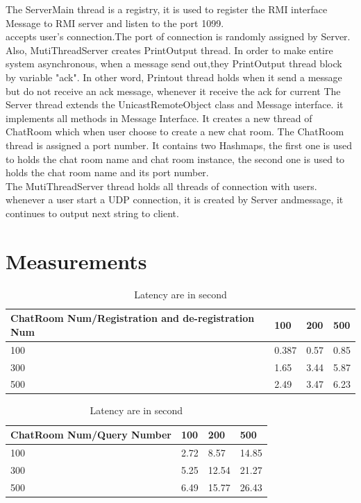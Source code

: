 \documentclass{article}
\begin{document}
The ServerMain thread is a registry, it is used to register the RMI interface Message to RMI server and listen to the port 1099.\\
 accepts user's connection.The port of connection is randomly assigned by Server. Also, MutiThreadServer creates PrintOutput thread. In order to make entire system asynchronous, when a message send out,they PrintOutput thread block by variable "ack". In other word, Printout thread holds when it send a message but do not receive an ack message, whenever it receive the ack for current 
The Server thread extends the UnicastRemoteObject class and Message interface. it implements all methods in Message Interface. It creates a new thread of ChatRoom which when user choose to create a new chat room. The ChatRoom thread is assigned a port number. It contains two Hashmaps, the first one is used to  holds the chat room name and chat room instance, the second one is used to holds the chat room name and its port number.\\

The MutiThreadServer thread holds all threads of connection with users. whenever a user start a UDP connection, it is created by Server andmessage, it continues to output next string to client.\\

\section{Measurements}


\begin{table}[h]
\begin{tabular}{|l|l|l|l|}
\hline
ChatRoom Num/Registration and de-registration Num & 100   & 200  & 500  \\ \hline
100                                               & 0.387 & 0.57 & 0.85 \\ \hline
300                                               & 1.65  & 3.44 & 5.87 \\ \hline
500                                               & 2.49  & 3.47 & 6.23 \\ \hline
\end{tabular}
\caption{Latency are in second}
\label{my-label}
\end{table}

\begin{table}[h]
\begin{tabular}{|l|l|l|l|}
\hline
ChatRoom Num/Query Number & 100   & 200  & 500  \\ \hline
100                                               & 2.72 & 8.57 & 14.85 \\ \hline
300                                               & 5.25  & 12.54 & 21.27 \\ \hline
500                                               & 6.49  & 15.77 & 26.43 \\ \hline
\end{tabular}
\caption{Latency are in second}
\label{my-label}
\end{table}
\end{document}
